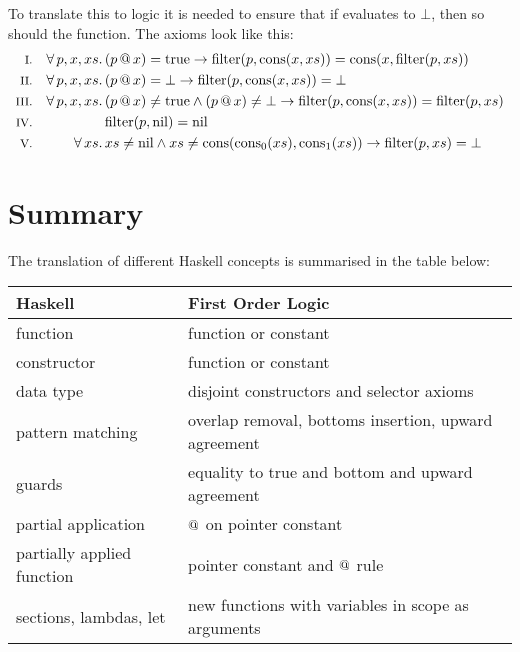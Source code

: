 To translate this to logic it is needed to ensure that if 
evaluates to $\bot$, then so should the function. The axioms look
like this:
\newcommand\filter[2]{\fn{filter}(#1,#2)}
\begin{align*}
\rom{1} && \faaa{p}{x}{xs} & (\app{p}{x}) = \fn{true}                                  \rightarrow \filter{p}{\cons{x}{xs}} = \cons{x}{\filter{p}{xs}} \\
\rom{2} && \faaa{p}{x}{xs} & (\app{p}{x}) = \bot                                       \rightarrow \filter{p}{\cons{x}{xs}} = \bot \\
\rom{3} && \faaa{p}{x}{xs} & (\app{p}{x}) \neq \fn{true} \wedge (\app{p}{x}) \neq \bot \rightarrow \filter{p}{\cons{x}{xs}} = \filter{p}{xs} \\
\rom{4} &&                 & \filter{p}{\fn{nil}} = \fn{nil} \\
\rom{5} && \fa{xs}         & xs \neq \fn{nil} \wedge xs \neq \uncons{xs} \rightarrow \filter{p}{xs} = \bot
\end{align*}

\section{Summary}

The translation of different Haskell concepts is summarised in the
table below:

\begin{table}[h!]
  \centering
  \begin{tabular}{|l|l|}
    \hline
    Haskell                    & First Order Logic \\
    \hline
    function                   & function or constant \\
    constructor                & function or constant \\
    data type                  & disjoint constructors and selector axioms \\
    pattern matching           & overlap removal, bottoms insertion, upward agreement \\
    guards                     & equality to true and bottom and upward agreement \\
    partial application        & $@$ on pointer constant \\
    partially applied function & pointer constant and $@$ rule \\
    sections, lambdas, let     & new functions with variables in scope as arguments \\
    \hline
  \end{tabular}

\end{table}

